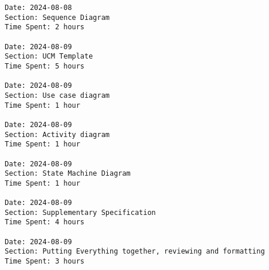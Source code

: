 \documentclass{article}
\begin{document}
\begin{verbatim}
Date: 2024-08-08
Section: Sequence Diagram
Time Spent: 2 hours

Date: 2024-08-09
Section: UCM Template
Time Spent: 5 hours

Date: 2024-08-09
Section: Use case diagram
Time Spent: 1 hour

Date: 2024-08-09
Section: Activity diagram
Time Spent: 1 hour

Date: 2024-08-09
Section: State Machine Diagram
Time Spent: 1 hour

Date: 2024-08-09
Section: Supplementary Specification
Time Spent: 4 hours

Date: 2024-08-09
Section: Putting Everything together, reviewing and formatting
Time Spent: 3 hours


\end{verbatim}
\end{document}
